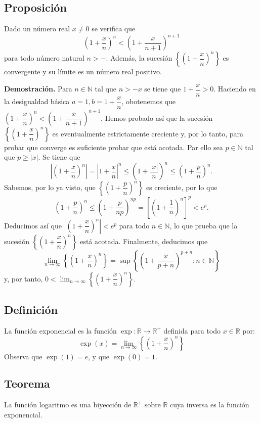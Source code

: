 \documentclass[10pt,a4paper]{article}
\begin{document}
	\subsection{Proposición}
	Dado un número real $x \neq 0$ se verifica que $$\left(1 + \dfrac{x}{n}\right) ^n < \left(1 + \dfrac{x}{n+1}\right)^{n+1}$$ para todo número natural $n > -$. Además, la sucesión $\left\{ \left(1 + \dfrac{x}{n}\right) ^n\right\}$ es convergente y su límite es un número real positivo.
	
	\textbf{Demostración. }Para $n \in \mathbb{N}$ tal que $n > -x$ se tiene que $1 + \dfrac{x}{n} > 0$. Haciendo en la desigualdad básica $a = 1, b = 1 + \dfrac{x}{n}$, obotenemos que $\left(1 + \dfrac{x}{n}\right) ^n < \left(1 + \dfrac{x}{n+1}\right)^{n+1}$. Hemos probado así que la sucesión $\left\{ \left(1 + \dfrac{x}{n}\right) ^n\right\}$ es eventualmente estrictamente creciente y, por lo tanto, para probar que converge es suficiente probar que está acotada. Par ello sea $p \in \mathbb{N}$ tal que $p \geq |x|$. Se tiene que $$\left|\left(1 + \dfrac{x}{n}\right) ^n\right| = \left|1 + \dfrac{x}{n}\right|^n \leq \left(1 + \dfrac{|x|}{n}\right) ^n \leq \left(1 + \dfrac{p}{n}\right) ^n.$$ Sabemos, por lo ya visto, que $\left\{ \left(1 + \dfrac{p}{n}\right) ^n\right\}$ es creciente, por lo que $$\left(1 + \dfrac{p}{n}\right) ^n \leq \left(1 + \dfrac{p}{np} \right) ^ {np} = \left[\left(1 + \dfrac{1}{n}\right) ^n \right] ^p < e^p.$$
	Deducimos así que $\left|\left(1 + \dfrac{x}{n}\right) ^n\right| < e^p$ para todo $n \in \mathbb{N}$, lo que prueba que la sucesión $\left\{ \left(1 + \dfrac{x}{n}\right) ^n\right\}$ está acotada. Finalmente, deducimos que $$\lim_{n \rightarrow \infty} \left\{ \left(1 + \dfrac{x}{n}\right) ^n\right\} = \sup\left\{ \left(1 + \dfrac{x}{p+n}\right) ^{p+n}: n \in \mathbb{N}\right\}$$ y, por tanto, $0 < \displaystyle \lim_{n \rightarrow \infty} \left\{ \left(1 + \dfrac{x}{n}\right) ^n\right\}$.
	
	\subsection{Definición}
	La función exponencial es la función $\exp: \mathbb{R} \rightarrow \mathbb{R} ^+$ definida para todo $ x \in \mathbb{R}$ por: $$ \exp(x) = \lim_{n \rightarrow \infty}\left\{ \left(1 + \dfrac{x}{n}\right) ^n\right\}$$
	Observa que $\exp(1) = e$, y que $\exp(0) = 1$.
	
	\subsection{Teorema}
	La función logaritmo es una biyección de $\mathbb{R} ^+ $ sobre $\mathbb{R}$ cuya inversa es la función exponencial.
	
\end{document}
